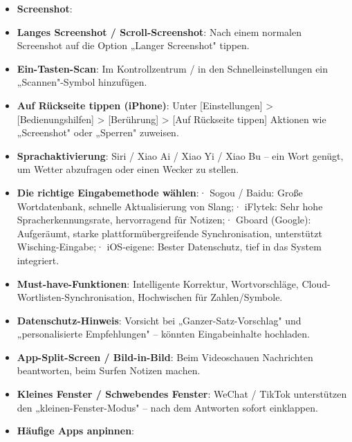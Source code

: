 
\begin{itemize}
  \item \textbf{Screenshot}:
  \item \textbf{Langes Screenshot / Scroll-Screenshot}: Nach einem normalen Screenshot auf die Option „Langer Screenshot" tippen.
  \item \textbf{Ein-Tasten-Scan}: Im Kontrollzentrum / in den Schnelleinstellungen ein „Scannen"-Symbol hinzufügen.
  \item \textbf{Auf Rückseite tippen (iPhone)}: Unter [Einstellungen] > [Bedienungshilfen] > [Berührung] > [Auf Rückseite tippen] Aktionen wie „Screenshot" oder „Sperren" zuweisen.
  \item \textbf{Sprachaktivierung}: Siri / Xiao Ai / Xiao Yi / Xiao Bu – ein Wort genügt, um Wetter abzufragen oder einen Wecker zu stellen.
\end{itemize}


\begin{itemize}
  \item \textbf{Die richtige Eingabemethode wählen}:\newline · Sogou / Baidu: Große Wortdatenbank, schnelle Aktualisierung von Slang;\newline · iFlytek: Sehr hohe Spracherkennungsrate, hervorragend für Notizen;\newline · Gboard (Google): Aufgeräumt, starke plattformübergreifende Synchronisation, unterstützt Wisching-Eingabe;\newline · iOS-eigene: Bester Datenschutz, tief in das System integriert.
  \item \textbf{Must-have-Funktionen}: Intelligente Korrektur, Wortvorschläge, Cloud-Wortlisten-Synchronisation, Hochwischen für Zahlen/Symbole.
  \item \textbf{Datenschutz-Hinweis}: Vorsicht bei „Ganzer-Satz-Vorschlag" und „personalisierte Empfehlungen" – könnten Eingabeinhalte hochladen.
\end{itemize}


\begin{itemize}
  \item \textbf{App-Split-Screen / Bild-in-Bild}: Beim Videoschauen Nachrichten beantworten, beim Surfen Notizen machen.
  \item \textbf{Kleines Fenster / Schwebendes Fenster}: WeChat / TikTok unterstützen den „kleinen-Fenster-Modus" – nach dem Antworten sofort einklappen.
  \item \textbf{Häufige Apps anpinnen}:
\end{itemize}

